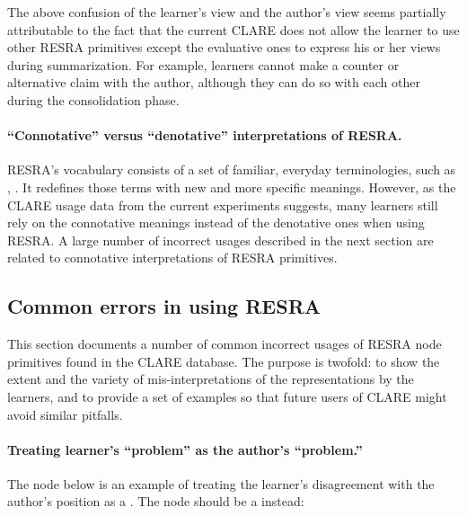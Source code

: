 The above confusion of the learner's view and the author's view
seems partially attributable to the fact that the current CLARE does not
allow the learner to use other RESRA primitives except the evaluative ones
to express his or her views during summarization. For example, learners
cannot make a counter or alternative claim with the author, although they
can do so with each other during the consolidation phase.


\paragraph{``Connotative'' versus ``denotative'' interpretations of RESRA.}

RESRA's vocabulary consists of a set of familiar, everyday terminologies,
such as , . It redefines those
terms with new and more specific meanings. However, as the CLARE usage data
from the current experiments suggests, many learners still rely on the
connotative meanings instead of the denotative ones when using RESRA. A
large number of incorrect usages described in the next section are related
to connotative interpretations of RESRA primitives.


\subsection{Common errors in using RESRA}
\label{common-errors}

This section documents a number of common incorrect usages of RESRA node
primitives found in the CLARE database. The purpose is twofold: to show the
extent and the variety of mis-interpretations of the representations by the
learners, and to provide a set of examples so that future users of CLARE
might avoid similar pitfalls.


\paragraph{Treating learner's ``problem'' as the author's ``problem.''}

The node below is an example of treating the learner's disagreement with
the author's position as a . The node should be a
 instead:

